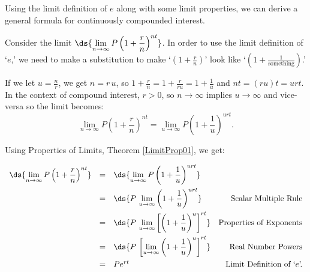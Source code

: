 \documentclass{ximera}
\begin{document}

\medskip

Using the limit definition of $e$ along with some limit properties, we can derive a general formula for continuously compounded interest. 

\medskip

 Consider the limit $\ds{\lim_{n \rightarrow \infty} P\left(1 + \frac{r}{n}\right)^{nt}}$.   In order to use the limit definition of `$e$,' we need to make a substitution to make `$\left(1 + \frac{r}{n}\right)$' look like `$\left(1 + \frac{1}{\text{something}}\right)$.'  
 
 \medskip
 
If we let $u = \frac{n}{r}$, we get $n = r \, u$, so  $1 + \frac{r}{n} = 1 + \frac{r}{ru} = 1 + \frac{1}{u}$ and $nt = (ru)t  = urt$.  In the context of compound interest, $r > 0$, so $n \rightarrow \infty$ implies $u \rightarrow \infty$ and vice-versa so the limit becomes: 
\[ \lim_{n \rightarrow \infty} P\left(1 + \frac{r}{n}\right)^{nt} =  \lim_{u \rightarrow \infty} P\left(1 + \frac{1}{u}\right)^{urt}.\]

\smallskip

Using Properties of Limits, Theorem \ref{LimitProp01}, we get:

\[ \begin{array}{rclr} 

\ds{\lim_{n \rightarrow \infty} P\left(1 + \frac{r}{n}\right)^{nt}} & = &  \ds{\lim_{u \rightarrow \infty} P\left(1 + \frac{1}{u}\right)^{urt}} & \\[10pt]
                                                                                        & = & \ds{P \, \lim_{u \rightarrow \infty} \left(1 + \frac{1}{u}\right)^{urt}} & \text{Scalar Multiple Rule} \\[10pt]
                                                                                        & = & \ds{P \, \lim_{u \rightarrow \infty} \left[\left(1 + \frac{1}{u}\right)^{u}\right]^{rt}} & \text{Properties of Exponents}\\[10pt]
                                                                                        & = & \ds{P \, \left[  \lim_{u \rightarrow \infty} \left(1 + \frac{1}{u}\right)^{u} \right]^{rt}} & \text{Real Number Powers}\\[10pt]
                                                                                        & = & Pe^{rt} & \text{Limit Definition of `$e$'.}\\ \end{array}\]
                                                                                        
\end{document}
